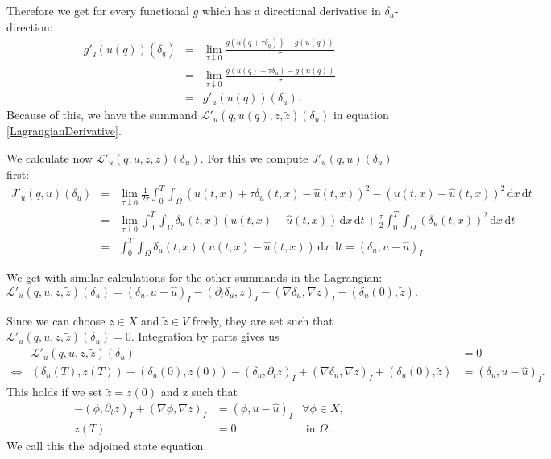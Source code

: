 Therefore we get for every functional $g$ which has a directional derivative in $\delta_u$-direction:
\begin{eqnarray*}
g'_q(u(q))(\delta_q)&=&\lim_{\tau\downarrow0}\frac{g(u(q+\tau\delta_q))-g(u(q))}{\tau}\\
&=&\lim_{\tau\downarrow0}\frac{g(u(q)+\tau\delta_u)-g(u(q))}{\tau}\\
&=&g'_u(u(q))(\delta_u).
\end{eqnarray*}
Because of this, we have the summand $\mathcal{L}'_u(q,u(q),z,\tilde{z})(\delta_u)$ in equation \eqref{LagrangianDerivative}.

We calculate now $\mathcal{L}'_u(q,u,z,\tilde{z})(\delta_u)$. For this we compute $J'_u(q, u)(\delta_u)$ first:
\begin{eqnarray*}
J'_u(q, u)(\delta_u)&=&\lim_{\tau\downarrow0}\frac{1}{2\tau}\int_0^T\int_\Omega(u(t,x)+\tau\delta_u(t, x)-\hat{u}(t,x))^2-(u(t,x)-\hat{u}(t,x))^2\,\mathrm{d}x\,\mathrm{d}t\\
&=&\lim_{\tau\downarrow0}\int_0^T\int_\Omega\delta_u(t, x)(u(t,x)-\hat{u}(t,x))\,\mathrm{d}x\,\mathrm{d}t+\frac{\tau}{2}\int_0^T\int_\Omega(\delta_u(t, x))^2\,\mathrm{d}x\,\mathrm{d}t\\
&=&\int_0^T\int_\Omega\delta_u(t, x)(u(t,x)-\hat{u}(t,x))\,\mathrm{d}x\,\mathrm{d}t=(\delta_u,u-\hat{u})_I
\end{eqnarray*}

We get with similar calculations for the other summands in the Lagrangian:
\begin{equation*}
\mathcal{L}'_u(q,u,z,\tilde{z})(\delta_u)=(\delta_u,u-\hat{u})_I-(\partial_t\delta_u,z)_I-(\nabla\delta_u,\nabla z)_I-(\delta_u(0),\tilde{z}).
\end{equation*}

Since we can choose $z\in X$ and $\tilde{z}\in V$ freely, they are set such that $\mathcal{L}'_u(q,u,z,\tilde{z})(\delta_u)=0$. Integration by parts gives us
\begin{eqnarray*}
&\mathcal{L}'_u(q,u,z,\tilde{z})(\delta_u)&=0\\
\iff&(\delta_u(T),z(T))-(\delta_u(0),z(0))-(\delta_u,\partial_tz)_I+(\nabla\delta_u,\nabla z)_I+(\delta_u(0),\tilde{z})&=(\delta_u,u-\hat{u})_I.
\end{eqnarray*}
This holds if we set $\tilde{z}=z(0)$ and z such that
\begin{equation}
\label{adjoinedStateEquation}
\begin{aligned}
	-(\phi,\partial_tz)_I+(\nabla \phi,\nabla z)_I&=(\phi, u-\hat{u})_I&\forall\phi\in X,\\
	z(T)&=0&\text{ in }\Omega.
\end{aligned}
\end{equation}
We call this the adjoined state equation.

